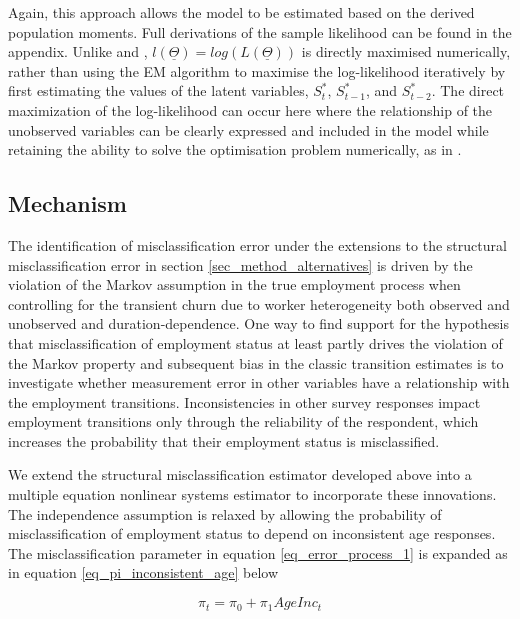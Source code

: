 \documentclass[letterpaper,12pt,final,dvipsnames]{article}
\begin{document}
Again, this approach allows the model to be estimated based on the derived population moments. Full derivations of the sample likelihood can be found in the appendix. Unlike \cite{shibata2019} and \cite{biemer2000}, $l(\underline{\Theta}) = log(L(\underline{\Theta}))$ is directly maximised numerically, rather than using the EM algorithm \citep{dempster1977} to maximise the log-likelihood iteratively by first estimating the values of the latent variables, $S_t^*$, $S_{t-1}^*$, and $S_{t-2}^*$. The direct maximization of the log-likelihood can occur here where the relationship of the unobserved variables can be clearly expressed and included in the model while retaining the ability to solve the optimisation problem numerically, as in \cite{satten1996}.

\subsection{Mechanism}  \label{subsec_mechanism}

The identification of misclassification error under the extensions to the structural misclassification error in section \ref{sec_method_alternatives} is driven by the violation of the Markov assumption in the true employment process when controlling for the transient churn due to worker heterogeneity \textemdash both observed and unobserved \textemdash and duration-dependence.
One way to find support for the hypothesis that misclassification of employment status at least partly drives the violation of the Markov property and subsequent bias in the classic transition estimates is to investigate whether measurement error in other variables have a relationship with the employment transitions. Inconsistencies in other survey responses impact employment transitions only through the reliability of the respondent, which increases the probability that their employment status is misclassified. 

We extend the structural misclassification estimator developed above into a multiple equation nonlinear systems estimator to incorporate these innovations. The independence assumption is relaxed by allowing the probability of misclassification of employment status to depend on inconsistent age responses. The misclassification parameter in equation \ref{eq_error_process_1} is expanded as in equation \ref{eq_pi_inconsistent_age} below

\begin{equation} \label{eq_pi_inconsistent_age}
    \pi_t = \pi_0 + \pi_1 AgeInc_t
\end{equation}
\end{document}
